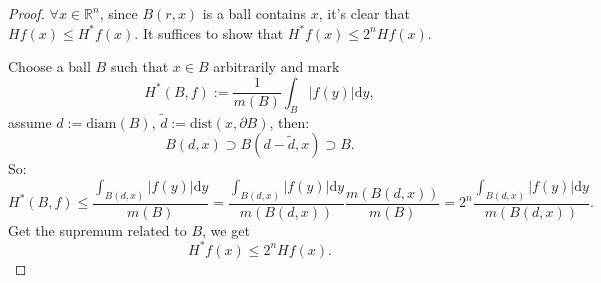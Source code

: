 \documentclass{article}
\newcommand{\dif}{\mathrm{d}}
\begin{document}
\begin{proof}
    $\forall x\in\mathbb{R}^{n}$, 
    since $B(r,x)$ is a ball contains $x$, it's clear that 
    $Hf(x)\le H^{*}f(x)$. It suffices to show that $H^{*}f(x)\le 2^{n}Hf(x)$. 
    
    Choose a ball $B$ such that $x\in B$ arbitrarily and mark 
    \begin{displaymath}
        H^{*}(B,f):=\frac{1}{m(B)}\int_{B}|f(y)|\dif y,
    \end{displaymath}
    assume $d:=\text{diam}(B)$, 
    $\tilde{d}:=\text{dist}(x,\partial B)$, then:
    \begin{displaymath}
        B(d,x)\supset B(d-\tilde{d},x)\supset B.
    \end{displaymath}
    So:
    \begin{displaymath}
        H^{*}(B,f)\le\frac{\int_{B(d,x)}|f(y)|\dif y}{m(B)}
        =\frac{\int_{B(d,x)}|f(y)|\dif y}{m(B(d,x))}\frac{m(B(d,x))}{m(B)}
        =2^{n}\frac{\int_{B(d,x)}|f(y)|\dif y}{m(B(d,x))}.
    \end{displaymath}
    Get the supremum related to $B$, we get 
    \begin{displaymath}
        H^{*}f(x)\le 2^{n}Hf(x).
    \end{displaymath}
\end{proof}
\end{document}
